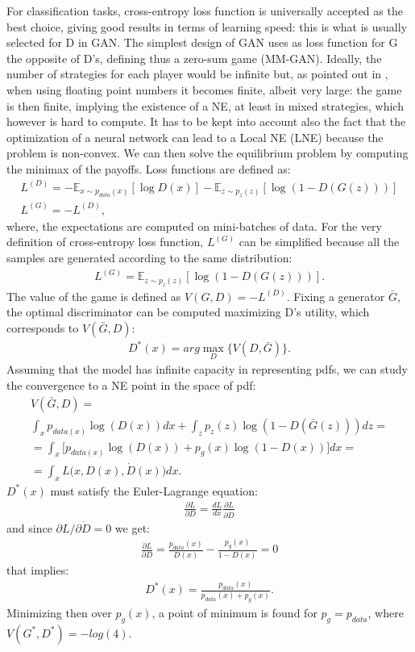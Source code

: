 For classification tasks, cross-entropy loss function is universally accepted as the best choice, giving good results in terms of learning speed: this is what is usually selected for D in GAN.
The simplest design of GAN uses as loss function for G the opposite of D's, defining thus a zero-sum game (MM-GAN).
Ideally, the number of strategies for each player would be infinite but, as pointed out in  \cite{2017arXiv171200679O}, when using floating point numbers it becomes finite, albeit very large: the game is then finite, implying the existence of a NE, at least in mixed strategies, which however is hard to compute.
It has to be kept into account also the fact that the optimization of a neural network can lead to a Local NE (LNE) because the problem is non-convex.
We can then solve the equilibrium problem by computing the minimax of the payoffs.
Loss functions are defined as:
\begin{align*}
L^{(D)} = -\mathbb{E}_{x \sim p_{data}(x)}[\log D(x)] - \mathbb{E}_{z \sim p_{z}(z)}[\log (1-D(G(z)))]\\
L^{(G)} = - L^{(D)},
\end{align*}
where, the expectations are computed on mini-batches of data.
For the very definition of cross-entropy loss function, $L^{(G)}$ can be simplified because all the samples are generated according to the same distribution: 
\begin{align*}
L^{(G)} = \mathbb{E}_{z \sim p_{z}(z)}[\log (1-D(G(z)))].
\end{align*}
The value of the game is defined as $V(G,D)=-L^{(D)}$.
Fixing a generator $\bar{G}$, the optimal discriminator can be computed maximizing D's utility, which corresponds to $V(\bar{G},D)$:
\begin{align*}
D^*(x) = arg\max\limits_{D} \big\{V(D,\bar{G}) \big\}.
\end{align*}
Assuming that the model has infinite capacity in representing pdfs, we can study the convergence to a NE point in the space of pdf:
\begin{align*}
	V(\bar{G},D) =\\
	 \int_x p_{data(x)} \log(D(x)) dx + \int_z p_{z}(z) \log(1-D(\bar{G}(z))) dz =\\ 
	= \int_x \Big[p_{data(x)} \log(D(x)) + p_{g}(x) \log(1-D(x)) \Big]dx =\\
	= \int_x L\big(x,D(x),\dot{D}(x)\big)dx.
\end{align*}
$D^*(x)$ must satisfy the Euler-Lagrange equation:
\begin{align*}
	\frac{\partial L}{\partial D} = \frac{d L}{d x} \frac{\partial L}{\partial \dot{D}}
\end{align*}
and since $\partial L / \partial \dot{D} = 0$ we get:
\begin{align*}
	\frac{\partial L}{\partial D} = \frac{p_{data}(x)}{D(x)} - \frac{p_g(x)}{1-D(x)} = 0
\end{align*}
that implies:
\begin{align*}
	D^*(x) = \frac{p_{data}(x)}{p_{data}(x) + p_g(x)}.
\end{align*}
Minimizing then over $p_g(x)$, a point of minimum is found for $p_g = p_{data}$, where $V(G^*,D^*)=-log(4)$.

